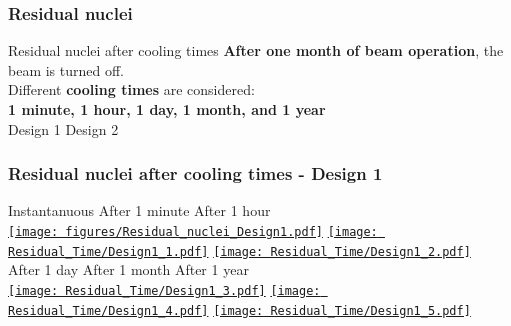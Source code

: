 \documentclass[xcolor={dvipsnames}]{beamer}
\begin{document}

\subsubsection{Residual nuclei}
\begin{frame}{Residual nuclei after cooling times}
\textbf{After one month of beam operation}, the beam is turned off.\\
Different \textbf{cooling times} are considered:\\
\textbf{1 minute, 1 hour, 1 day, 1 month, and 1 year}\\
\vspace*{0.3cm}
\hspace*{1.6cm} Design 1 \hfill Design 2 \hspace*{1.8cm} \\
  \begin{center}
  \end{center}
\end{frame}
\begin{frame}
  \frametitle{Residual nuclei after cooling times - \textbf{Design 1}}
  \hypertarget{residualtimesprev_Design1}{}
  \begin{center}
    \hspace*{1.6cm} Instantanuous \hfill After 1 minute \hfill After 1 hour \hspace*{1.8cm} \\
  \hyperlink{Residual_nuclei_Design1}{\texttt{[image: figures/Residual\_nuclei\_Design1.pdf]}}
  \hyperlink{Residual_nuclei_minute_Design1}{\texttt{[image: Residual\_Time/Design1\_1.pdf]}}
  \hyperlink{Residual_nuclei_hour_Design1}{\texttt{[image: Residual\_Time/Design1\_2.pdf]}}\\
    \hspace*{1.6cm} After 1 day \hfill After 1 month \hfill After 1 year\hspace*{1.8cm} \\
  \hyperlink{Residual_nuclei_day_Design1}{\texttt{[image: Residual\_Time/Design1\_3.pdf]}}
  \hyperlink{Residual_nuclei_month_Design1}{\texttt{[image: Residual\_Time/Design1\_4.pdf]}}
  \hyperlink{Residual_nuclei_year_Design1}{\texttt{[image: Residual\_Time/Design1\_5.pdf]}}
 \end{center}
\end{frame}
\end{document}
